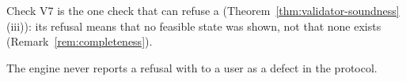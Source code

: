 
Check V7 is the one check that can refuse a 
(Theorem~\ref{thm:validator-soundness}\,(iii)): its refusal means that no feasible state was
shown, not that none exists (Remark~\ref{rem:completeness}).

\begin{requirement}\label{req:witness-refusal-meaning}
The engine never reports a refusal with  to a
user as a defect in the protocol.
\end{requirement}

